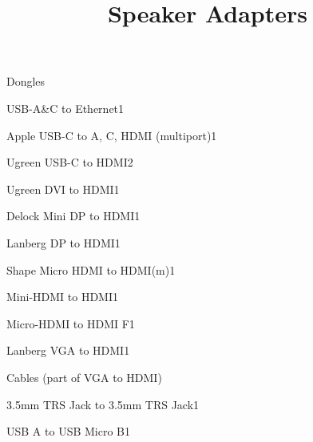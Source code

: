 \def\papersize{5}




\title{Speaker Adapters}

\begin{checklist}{Dongles}
  \item{USB-A\&C to Ethernet}{1}
  \item{Apple USB-C to A, C, HDMI (multiport)}{1}
  \item{Ugreen USB-C to HDMI}{2}
  \item{Ugreen DVI to HDMI}{1}
  \item{Delock Mini DP to HDMI}{1}
  \item{Lanberg DP to HDMI}{1}
  \item{Shape Micro HDMI to HDMI(m)}{1}
  \item{Mini-HDMI to HDMI}{1}
  \item{Micro-HDMI to HDMI F}{1}
  \item{Lanberg VGA to HDMI}{1}
\end{checklist}
\begin{checklist}{Cables (part of VGA to HDMI)}
  \item{3.5mm TRS Jack to 3.5mm TRS Jack}{1}
  \item{USB A to USB Micro B}{1}
\end{checklist}


